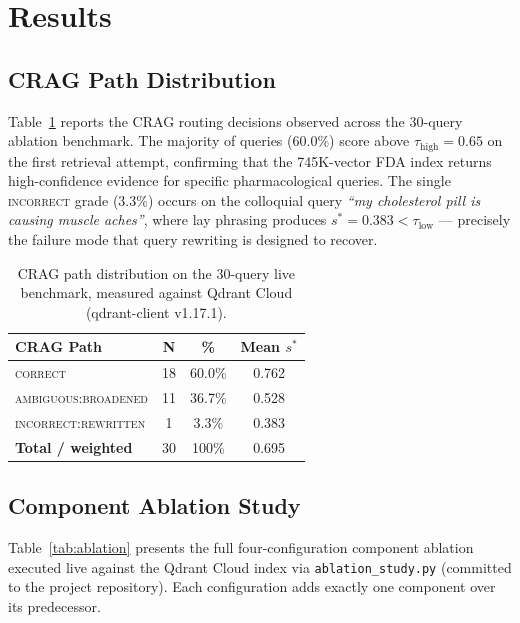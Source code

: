 \documentclass[10pt, twocolumn]{article}
\begin{document}
\section{Results}
\label{sec:results}

\subsection{CRAG Path Distribution}

Table~\ref{tab:paths} reports the CRAG routing decisions observed across
the 30-query ablation benchmark.  The majority of queries (60.0\%) score
above $\tau_{\text{high}} = 0.65$ on the first retrieval attempt,
confirming that the 745K-vector FDA index returns high-confidence
evidence for specific pharmacological queries.  The single
\textsc{incorrect} grade (3.3\%) occurs on the colloquial query
\textit{``my cholesterol pill is causing muscle aches''}, where lay
phrasing produces $s^{*} = 0.383 < \tau_{\text{low}}$ — precisely the
failure mode that query rewriting is designed to recover.

\begin{table}[H]
  \centering
  \caption{CRAG path distribution on the 30-query live benchmark,
    measured against Qdrant Cloud (qdrant-client v1.17.1).}
  \label{tab:paths}
  \begin{tabular}{@{}lccc@{}}
    \toprule
    \textbf{CRAG Path}          & \textbf{N} & \textbf{\%} & \textbf{Mean $s^{*}$} \\
    \midrule
    \textsc{correct}             & 18 & 60.0\% & 0.762 \\
    \textsc{ambiguous:broadened} & 11 & 36.7\% & 0.528 \\
    \textsc{incorrect:rewritten} &  1 &  3.3\% & 0.383 \\
    \midrule
    \textbf{Total / weighted}    & 30 & 100\%  & 0.695 \\
    \bottomrule
  \end{tabular}
\end{table}

\subsection{Component Ablation Study}
\label{sec:ablation}

Table~\ref{tab:ablation} presents the full four-configuration component
ablation executed live against the Qdrant Cloud index via
\texttt{ablation\_study.py} (committed to the project repository).
Each configuration adds exactly one component over its predecessor.
\end{document}
